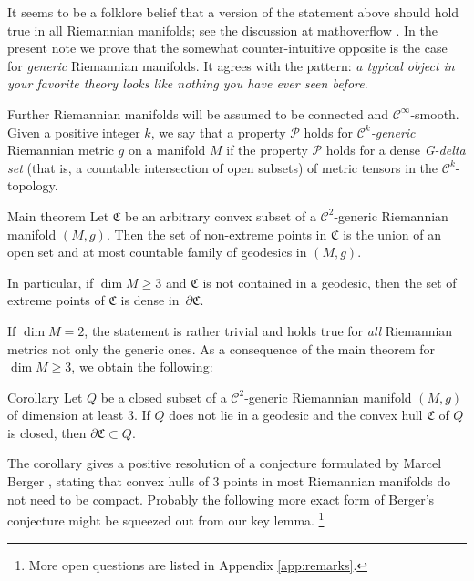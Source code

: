 \documentclass[a4paper,10pt]{article}
\begin{document}
It seems to be a folklore belief that a version of the statement above should hold true in all Riemannian manifolds;
see the discussion at mathoverflow \cite{petrunin-2009}.
In the present note we prove that the somewhat counter-intuitive opposite is the case for \emph{generic} Riemannian manifolds.
It agrees with the pattern: \emph{a typical object in your favorite theory looks like nothing you have ever seen before}.

Further Riemannian manifolds will be assumed to be connected and $\mathcal C^\infty$-smooth.
Given a positive integer $k$, we say that a property $\mathcal P$ holds for \emph{$\mathcal C^k$-generic} Riemannian metric $g$ on a manifold $M$ 
if the property $\mathcal P$ holds for a dense \emph{G-delta set} (that is, a countable intersection of open subsets) of metric tensors in the $\mathcal C^k$-topology.

\begin{thm}{Main theorem}\label{thm:main}
Let $\mathfrak C$ be an arbitrary convex subset of a $\mathcal C^2$-generic Riemannian manifold $(M,g)$.
Then the set of non-extreme points in $\mathfrak C$ is the union of an open set and at most countable family of geodesics in $(M,g)$. 

In particular, if $\dim M\ge 3$ and $\mathfrak C$ is not contained in a geodesic, then the set of
extreme points of $\mathfrak{C}$ is dense in~$\partial\mathfrak{C}$.
\end{thm}



If $\dim M =2$, the statement is rather trivial and holds true for \emph{all} Riemannian metrics not only the generic ones.
As a consequence  of the main theorem for $\dim M \geq 3$, we obtain the following:

\begin{thm}{Corollary}\label{cor:caratheodory}
Let $Q$ be a closed subset of a $\mathcal C^2$-generic Riemannian manifold $(M,g)$ of dimension at least $3$. If $Q$ does not lie in a  geodesic and
the convex hull $\mathfrak C$ of $Q$ is closed, then $\partial \mathfrak C \subset Q$.
\end{thm}

The corollary gives a positive resolution of a conjecture formulated by Marcel Berger
\cite[Note 6.1.3.1]{berger-2003}, stating that convex hulls of $3$ points in most Riemannian manifolds do not need to be  compact.
Probably  the following more exact form of Berger's conjecture might be squeezed out from our key lemma.%
\footnote{More open questions are listed in  Appendix \ref{app:remarks}.}
\end{document}
